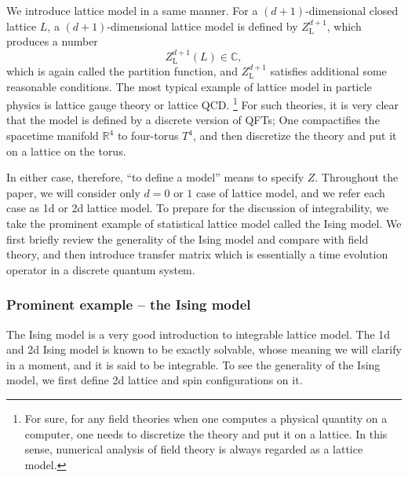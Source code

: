 We introduce lattice model in a same manner. For a $(d+1)$-dimensional
closed lattice $L$, a $(d+1)$-dimensional lattice model is defined
by $Z_{\mathrm{L}}^{d+1}$, which produces a number
\begin{equation}
  Z_{\mathrm{L}}^{d+1}(L)  \in  \mathbb{C},
\label{eq:lattice_Z}
\end{equation}
which is again called the partition function, and $Z_{\mathrm{L}}^{d+1}$
satisfies additional some reasonable conditions. The most typical
example of lattice model in particle physics is lattice gauge theory
or lattice QCD.%
%
\footnote{For sure, for any field theories when one computes a physical quantity
on a computer, one needs to discretize the theory and put it on a
lattice. In this sense, numerical analysis of field theory is always
regarded as a lattice model. }
%
For such theories, it is very clear that the model is defined by
a discrete version of QFTs; One compactifies the spacetime manifold
$\mathbb{R}^{4}$ to four-torus $T^{4}$, and then discretize the
theory and put it on a lattice on the torus.

In either case, therefore, ``to define a model'' means to specify $Z$.
Throughout the paper, we will consider only $d=0$ or $1$ case of
lattice model, and we refer each case as 1d or 2d lattice model. To
prepare for the discussion of integrability, we take the prominent
example of statistical lattice model called the Ising model. We first
briefly review the generality of the Ising model and compare with
field theory, and then introduce transfer matrix which is essentially
a time evolution operator in a discrete quantum system.





\subsubsection{Prominent example -- the Ising model}

The Ising model is a very good introduction to integrable lattice
model. The 1d and 2d Ising model is known to be exactly solvable,
whose meaning we will clarify in a moment, and it is said to be integrable.
To see the generality of the Ising model, we first define 2d lattice
and spin configurations on it.

